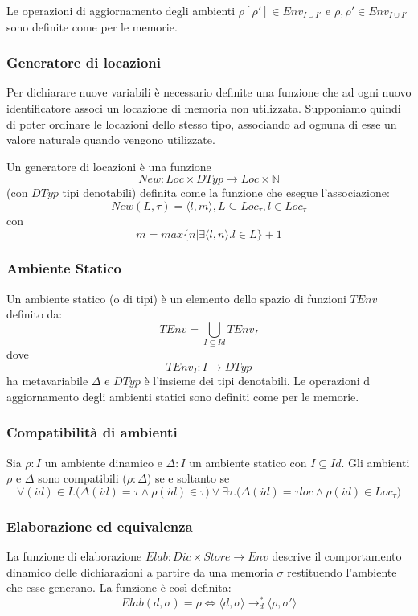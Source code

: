 \documentclass[a4paper, 10pt]{article}
\begin{document}
	Le operazioni di aggiornamento degli ambienti $\rho[\rho'] \in Env_{I \cup I'}$ e $\rho,\rho' \in Env_{I \cup I'}$ sono definite come per le memorie.
	
	\subsubsection{Generatore di locazioni}
	Per dichiarare nuove variabili è necessario definite una funzione che ad ogni nuovo identificatore associ un locazione di memoria non utilizzata. Supponiamo quindi di poter ordinare le locazioni dello stesso tipo, associando ad ognuna di esse un valore naturale quando vengono utilizzate.
	
	Un generatore di locazioni è una funzione 
	\[
	New:Loc \times DTyp \to Loc \times \mathbb{N}
	\]  
	(con $DTyp$ tipi denotabili) definita come la funzione che esegue l'associazione:
	\[
	New(L, \tau) = \langle l,m \rangle, L \subseteq Loc_\tau, l\in Loc_\tau
	\] con 
	\[
	m=max\{n | \exists \langle l,n \rangle.l\in L\}+1
	\]
	
	\subsubsection{Ambiente Statico}
	Un ambiente statico (o di tipi) è un elemento dello spazio di funzioni $TEnv$ definito da: 
	\[
	TEnv= \bigcup\limits_{I \subseteq Id} TEnv_I
	\]
	dove 
	\[
	TEnv_I:I \to DTyp
	\] 
	ha metavariabile $\Delta$ e $DTyp$ è l'insieme dei tipi denotabili. Le operazioni d aggiornamento degli ambienti statici sono definiti come per le memorie.
	
	\subsubsection{Compatibilità di ambienti}
	Sia $\rho : I$ un ambiente dinamico e $\Delta:I$ un ambiente statico con $I\subseteq Id$. Gli ambienti $\rho$ e $\Delta$ sono compatibili ($\rho : \Delta$) se e soltanto se 
	\[
	\forall(id) \in I.\big(\Delta(id)=\tau \wedge \rho(id) \in \tau\big) \vee \exists \tau.\big(\Delta(id) = \tau loc \wedge \rho(id) \in Loc_\tau\big)
	\]
	
	\subsubsection{Elaborazione ed equivalenza}
	La funzione di elaborazione $Elab:Dic \times Store \to Env$ descrive il comportamento dinamico delle dichiarazioni a partire da una memoria $\sigma$ restituendo l'ambiente che esse generano. La funzione è così definita:
	\[
	Elab(d, \sigma)=\rho \iff \langle d,\sigma \rangle \to_d^* \langle \rho, \sigma' \rangle
	\]
	
\end{document}
